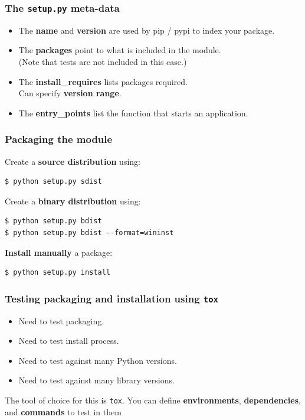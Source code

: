 \documentclass{beamer} %
\newcommand\emc[1]{\textcolor{midred}{\textbf{#1}}}
\begin{document}
\begin{frame}

\frametitle{The \texttt{setup.py} meta-data}

\begin{itemize}
  \item The \emc{name} and \emc{version} are used by pip / pypi to index your package.
  \item The \emc{packages} point to what is included in the module. \\ (Note that tests are not included in this case.)
  \item The \emc{install\_requires} lists packages required. \\ Can specify \emc{version range}. 
  \item The \emc{entry\_points} list the function that starts an application.
  \end{itemize}

\end{frame}

\begin{frame}[fragile]

\frametitle{Packaging the module}

Create a \emc{source distribution} using:
\begin{verbatim}
$ python setup.py sdist
\end{verbatim}

\vspace{3mm}
Create a \emc{binary distribution} using:
\begin{verbatim}
$ python setup.py bdist
$ python setup.py bdist --format=wininst
\end{verbatim}

\vspace{3mm}
\emc{Install manually} a package:
\begin{verbatim}
$ python setup.py install
\end{verbatim}

\end{frame}

\begin{frame}

\frametitle{Testing packaging and installation using \texttt{tox}}

\begin{itemize}
  \item Need to test packaging.
  \item Need to test install process.
  \item Need to test against many Python versions.
  \item Need to test against many library versions.
  \end{itemize}

  \vspace{5mm}
  The tool of choice for this is \texttt{tox}. You can define \emc{environments}, \emc{dependencies}, and \emc{commands} to test in them

\end{frame}
\end{document}
